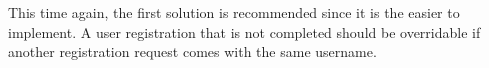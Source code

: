 ﻿\documentclass[../report.tex]{subfiles}
\begin{document}
This time again, the first solution is recommended since it is the easier to implement.
A user registration that is not completed should be overridable if another registration request comes with the same username.


% 
% 
% 
% 
% 
% 
% 
% 
\end{document}
